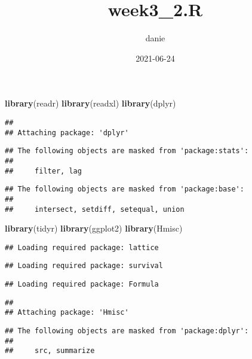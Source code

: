 \documentclass[
]{article}
\title{week3\_2.R}
\author{danie}
\date{2021-06-24}
\newenvironment{Shaded}{\begin{snugshade}}{\end{snugshade}}
\newcommand{\KeywordTok}[1]{\textcolor[rgb]{0.13,0.29,0.53}{\textbf{#1}}}
\newcommand{\NormalTok}[1]{#1}
\begin{document}
\maketitle

\begin{Shaded}
\begin{Highlighting}[]
\KeywordTok{library}\NormalTok{(readr)}
\KeywordTok{library}\NormalTok{(readxl)}
\KeywordTok{library}\NormalTok{(dplyr)}
\end{Highlighting}
\end{Shaded}

\begin{verbatim}
## 
## Attaching package: 'dplyr'
\end{verbatim}

\begin{verbatim}
## The following objects are masked from 'package:stats':
## 
##     filter, lag
\end{verbatim}

\begin{verbatim}
## The following objects are masked from 'package:base':
## 
##     intersect, setdiff, setequal, union
\end{verbatim}

\begin{Shaded}
\begin{Highlighting}[]
\KeywordTok{library}\NormalTok{(tidyr)}
\KeywordTok{library}\NormalTok{(ggplot2)}
\KeywordTok{library}\NormalTok{(Hmisc)}
\end{Highlighting}
\end{Shaded}

\begin{verbatim}
## Loading required package: lattice
\end{verbatim}

\begin{verbatim}
## Loading required package: survival
\end{verbatim}

\begin{verbatim}
## Loading required package: Formula
\end{verbatim}

\begin{verbatim}
## 
## Attaching package: 'Hmisc'
\end{verbatim}

\begin{verbatim}
## The following objects are masked from 'package:dplyr':
## 
##     src, summarize
\end{verbatim}
\end{document}
